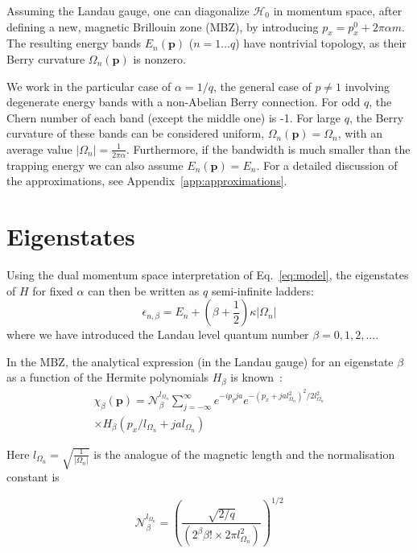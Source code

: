 \documentclass[twocolumn, 10pt, aps, superscriptaddress, floatfix, showpacs, pra, citeautoscript]{revtex4-1}
\newcommand{\vt}[1]{\mathbf{#1}}
\begin{document}
Assuming the Landau gauge, one can diagonalize $\mathcal{H}_0$ in
momentum space, after defining a new, magnetic Brillouin zone (MBZ),
by introducing $p_x = p_x^0 + 2\pi \alpha m$. The resulting energy
bands $E_n(\vt{p})$ ($n = 1 \dots q$) have nontrivial topology, as
their Berry curvature $\Omega_n(\vt{p})$ is nonzero.

We work in the particular case of $\alpha=1/q$, the general case of
$p \neq 1$ involving degenerate energy bands with a non-Abelian Berry
connection.  For odd $q$, the Chern number of each band (except the
middle one) is -1. For large $q$, the Berry curvature of these bands
can be considered uniform, $\Omega_n(\vt{p}) = \Omega_n$, with an
average value $|\Omega_n| = \frac{1}{2\pi\alpha}$. Furthermore, if the
bandwidth is much smaller than the trapping energy we can also assume
$E_n(\vt{p}) = E_n$. For a detailed discussion of the approximations,
see Appendix~\ref{app:approximations}.

\section{Eigenstates}\label{sec:eigenstates}
Using the dual momentum space interpretation of Eq.~\eqref{eq:model},
the eigenstates of $H$ for fixed $\alpha$ can then be written
as $q$ semi-infinite ladders:~\cite{price2014magnetic}
%
\begin{equation}\label{eq:ladders}
  \epsilon_{n,\beta} = E_n + \left(\beta + \frac{1}{2}\right) \kappa |\Omega_n|
\end{equation}
where we have introduced the Landau level quantum number
$\beta = 0,1,2,\dots$.

In the MBZ, the analytical expression (in the Landau gauge) for an
eigenstate $\beta$ as a function of the Hermite polynomials $H_\beta$
is known~\cite{price2014magnetic}:
%
\begin{multline}\label{eq:chi}
 \chi_\beta (\vt{p}) = \mathcal{N}_\beta^{l_{\Omega_n}} \sum_{j = -
 \infty}^{\infty} e^{- i p_y j a} e^{ - ( p_x + j a l_{\Omega_n}^2 )
 ^2 / 2 l_{\Omega_n}^2}\\
 \times H_\beta ( p_x / l_{\Omega_n} + j a
 l_{\Omega_n})
\end{multline}

Here $l_{\Omega_n} = \sqrt{\frac{1}{|\Omega_n|}}$ is the analogue of
the magnetic length and the normalisation constant is

\begin{equation}
\mathcal{N}_\beta^{l_{\Omega_n}} = \left( \frac{\sqrt{2/q}} {(2^\beta
\beta! \times 2 \pi l_{\Omega_n}^2)} \right)^{1/2}
\end{equation}
\end{document}
